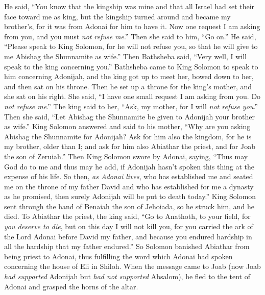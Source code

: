 \begin{biblechapter}
\verse He said, “You know that the kingship was mine and that all Israel had set their face toward me as king, but the kingship turned around and became my brother’s, for it was from Adonai for him to have it.
\verse Now one request I am asking from you, and you must \textit{not refuse me}.” Then she said to him, “Go on.”
\verse He said, “Please speak to King Solomon, for he will not refuse you, so that he will give to me Abishag the Shunnamite as wife.”
\verse Then Bathsheba said, “Very well, I will speak to the king concerning you.”
 Bathsheba came to King Solomon to speak to him concerning Adonijah, and the king got up to meet her, bowed down to her, and then sat on his throne. Then he set up a throne for the king’s mother, and she sat on his right.
\verse She said, “I have one small request I am asking from you. Do \textit{not refuse me}.” The king said to her, “Ask, my mother, for I will \textit{not refuse you}.”
\verse Then she said, “Let Abishag the Shunnamite be given to Adonijah your brother as wife.”
\verse King Solomon answered and said to his mother, “Why are you asking Abishag the Shunnamite for Adonijah? Ask for him also the kingdom, for he is my brother, older than I; and ask for him also Abiathar the priest, and for Joab the son of Zeruiah.”
\verse Then King Solomon swore by Adonai, saying, “Thus may God do to me and thus may he add, if Adonijah hasn’t spoken this thing at the expense of his life.
\verse So then, \textit{as Adonai lives}, who has established me and seated me on the throne of my father David and who has established for me a dynasty as he promised, then surely Adonijah will be put to death today.”
\verse King Solomon sent through the hand of Benaiah the son of Jehoiada, so he struck him, and he died.
\verse To Abiathar the priest, the king said, “Go to Anathoth, to your field, for \textit{you deserve to die}, but on this day I will not kill you, for you carried the ark of the Lord Adonai before David my father, and because you endured hardship in all the hardship that my father endured.”
\verse So Solomon banished Abiathar from being priest to Adonai, thus fulfilling the word which Adonai had spoken concerning the house of Eli in Shiloh.
\verse When the message came to Joab (now Joab \textit{had supported} Adonijah but \textit{had not supported} Absalom), he fled to the tent of Adonai and grasped the horns of the altar.

\end{biblechapter}
